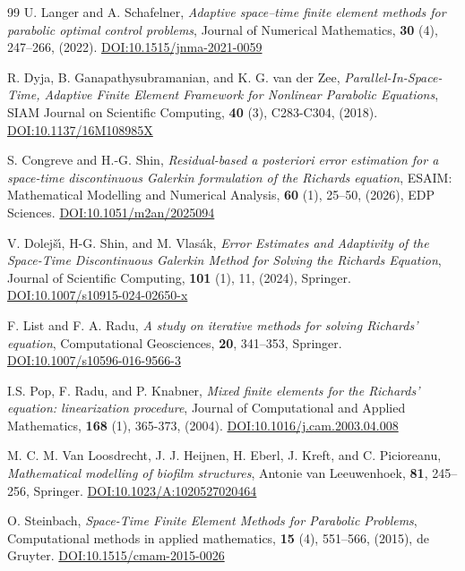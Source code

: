 \documentclass[review,11pt]{article}
\numberwithin{equation}{section}
\begin{document}
\begin{thebibliography}{99}
U. Langer and A. Schafelner, \emph{Adaptive space--time finite element methods for parabolic optimal control problems}, Journal of Numerical Mathematics, \textbf{30} (4), 247--266, (2022). \href{https://doi.org/10.1515/jnma-2021-0059}{DOI:10.1515/jnma-2021-0059}

R. Dyja, B. Ganapathysubramanian, and K. G. van der Zee, \emph{{Parallel-In-Space-Time}, {Adaptive} {Finite} {Element} {Framework} for {Nonlinear} {Parabolic} {Equations}}, SIAM Journal on Scientific Computing, \textbf{40} (3), C283-C304, (2018). \href{https://doi.org/10.1137/16M108985X}{DOI:10.1137/16M108985X}

S. Congreve and H.-G. Shin, \emph{Residual-based a posteriori error estimation for a space-time discontinuous {Galerkin formulation of the Richards} equation}, ESAIM: Mathematical Modelling and Numerical Analysis, \textbf{60} (1), 25--50, (2026), EDP Sciences. \href{ https://doi.org/10.1051/m2an/2025094}{DOI:10.1051/m2an/2025094}


V. Dolej{\v{s}}{\'\i}, H-G. Shin, and M. Vlas{\'a}k, \emph{Error Estimates and Adaptivity of the Space-Time Discontinuous {Galerkin} Method for Solving the {Richards} Equation}, Journal of Scientific Computing, \textbf{101} (1), 11, (2024), Springer. \href{ https://doi.org/10.1007/s10915-024-02650-x}{DOI:10.1007/s10915-024-02650-x}


F. List and F. A. Radu, \emph{A study on iterative methods for solving {R}ichards' equation}, Computational Geosciences, \textbf{20}, 341--353, Springer. \href{https://doi.org/10.1007/s10596-016-9566-3}{DOI:10.1007/s10596-016-9566-3}

I.S. Pop, F. Radu, and P. Knabner, \emph{Mixed finite elements for the {Richards'} equation: linearization procedure}, Journal of Computational and Applied Mathematics, \textbf{168} (1), 365-373, (2004). \href{https://doi.org/10.1016/j.cam.2003.04.008}{DOI:10.1016/j.cam.2003.04.008}


M. C. M. Van Loosdrecht, J. J. Heijnen, H. Eberl, J. Kreft, and C. Picioreanu, \emph{Mathematical modelling of biofilm structures}, Antonie van Leeuwenhoek, \textbf{81}, 245--256, Springer. \href{https://doi.org/10.1023/A:1020527020464}{DOI:10.1023/A:1020527020464}

O. Steinbach, \emph{{Space-Time Finite Element Methods} for {Parabolic Problems}}, Computational methods in applied mathematics, \textbf{15} (4), 551--566, (2015), de Gruyter. \href{https://doi.org/10.1515/cmam-2015-0026}{DOI:10.1515/cmam-2015-0026}


\end{thebibliography}
\end{document}
